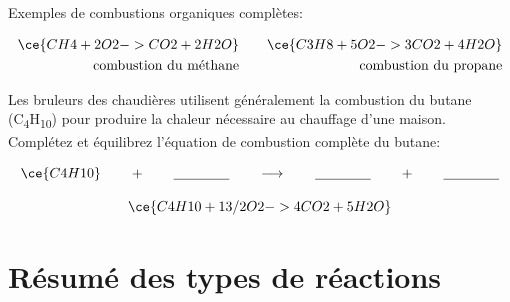 \documentclass[
  11pt,
  a4paper,
  openany]{book}
\begin{document}
Exemples de combustions organiques complètes:

\[ \begin{split}
  \ce{CH4 + 2O2 -> CO2 + 2H2O} \\
  \text{combustion du méthane}
  \end{split}
  \qquad
  \begin{split}
  \ce{C3H8 + 5O2 -> 3CO2 + 4H2O} \\
    \text{combustion du propane}
  \end{split} \]

\begin{Exercise}
Les bruleurs des chaudières utilisent généralement la combustion du butane (C\textsubscript{4}H\textsubscript{10}) pour produire la chaleur nécessaire au chauffage d'une maison. Complétez et équilibrez l'équation de combustion complète du butane:

\[ \ce{C4H10} \qquad + \qquad \underline{\qquad\qquad} \qquad \longrightarrow \qquad \underline{\qquad\qquad} \qquad + \qquad \underline{\qquad\qquad} \]

\end{Exercise}

\begin{Answer}
\[ \ce{C4H10 + 13/2O2 -> 4CO2 + 5H2O} \]

\end{Answer}

\section{Résumé des types de réactions}\label{ruxe9sumuxe9-des-types-de-ruxe9actions}
\end{document}
